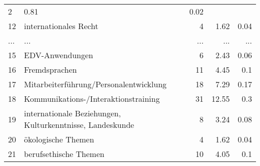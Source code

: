\begin{longtable}{lXrrr}
          \num{2} &
          \num[round-mode=places,round-precision=2]{0.81} &
          \num[round-mode=places,round-precision=2]{0.02} \\
        12 & \multicolumn{1}{X}{internationales Recht} & %
          \num{4} &
          \num[round-mode=places,round-precision=2]{1.62} &
          \num[round-mode=places,round-precision=2]{0.04} \\
       ... & ... & ... & ... & ... \\
        15 & \multicolumn{1}{X}{EDV-Anwendungen} & %
          \num{6} &
          \num[round-mode=places,round-precision=2]{2.43} &
          \num[round-mode=places,round-precision=2]{0.06} \\

        16 & \multicolumn{1}{X}{Fremdsprachen} & %
          \num{11} &
          \num[round-mode=places,round-precision=2]{4.45} &
          \num[round-mode=places,round-precision=2]{0.1} \\

        17 & \multicolumn{1}{X}{Mitarbeiterführung/Personalentwicklung} & %
          \num{18} &
          \num[round-mode=places,round-precision=2]{7.29} &
          \num[round-mode=places,round-precision=2]{0.17} \\

        18 & \multicolumn{1}{X}{Kommunikations-/Interaktionstraining} & %
          \num{31} &
          \num[round-mode=places,round-precision=2]{12.55} &
          \num[round-mode=places,round-precision=2]{0.3} \\

        19 & \multicolumn{1}{X}{internationale Beziehungen, Kulturkenntnisse, Landeskunde} & %
          \num{8} &
          \num[round-mode=places,round-precision=2]{3.24} &
          \num[round-mode=places,round-precision=2]{0.08} \\

        20 & \multicolumn{1}{X}{ökologische Themen} & %
          \num{4} &
          \num[round-mode=places,round-precision=2]{1.62} &
          \num[round-mode=places,round-precision=2]{0.04} \\

        21 & \multicolumn{1}{X}{berufsethische Themen} & %
          \num{10} &
          \num[round-mode=places,round-precision=2]{4.05} &
          \num[round-mode=places,round-precision=2]{0.1} \\


\end{longtable}
